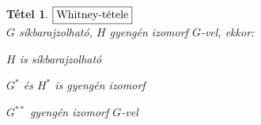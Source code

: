 \documentclass[a4paper,12pt,twoside]{book}
\newtheorem{tetel}{Tétel}[chapter]
\theoremstyle{break}
\begin{document}
\begin{tetel}$\boxed{$Whitney-tétele$}$\\
$G$ síkbarajzolható, $H$ gyengén izomorf $G$-vel, ekkor:
\begin{enumerate*}
 \item $H$ is síkbarajzolható
 \item $G^*$ és $H^*$ is gyengén izomorf
 \item $G^{**}$ gyengén izomorf $G$-vel
\end{enumerate*}
\end{tetel}
\addtocounter{biz}{1}
\end{document}
